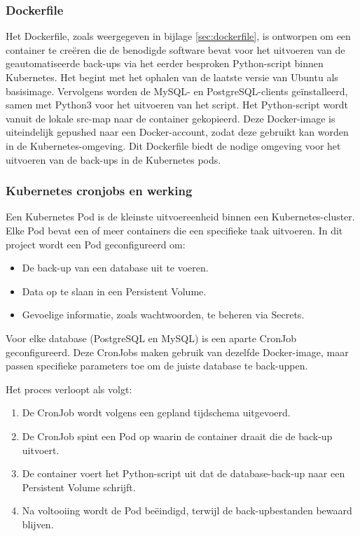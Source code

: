 \subsubsection{Dockerfile}
Het Dockerfile, zoals weergegeven in bijlage \ref{sec:dockerfile}, is ontworpen om een container te creëren die de benodigde software bevat voor het uitvoeren van de geautomatiseerde back-ups via het eerder besproken Python-script binnen Kubernetes. Het begint met het ophalen van de laatste versie van Ubuntu als basisimage. Vervolgens worden de MySQL- en PostgreSQL-clients geïnstalleerd, samen met Python3 voor het uitvoeren van het script. Het Python-script wordt vanuit de lokale src-map naar de container gekopieerd. Deze Docker-image is uiteindelijk gepushed naar een Docker-account, zodat deze gebruikt kan worden in de Kubernetes-omgeving. Dit Dockerfile biedt de nodige omgeving voor het uitvoeren van de back-ups in de Kubernetes pods.


\subsubsection{Kubernetes cronjobs en werking}
Een Kubernetes Pod is de kleinste uitvoereenheid binnen een Kubernetes-cluster. Elke Pod bevat een of meer containers die een specifieke taak uitvoeren. In dit project wordt een Pod geconfigureerd om:
\begin{itemize}
    \item De back-up van een database uit te voeren.
    \item Data op te slaan in een Persistent Volume.
    \item Gevoelige informatie, zoals wachtwoorden, te beheren via Secrets.
\end{itemize}

Voor elke database (PostgreSQL en MySQL) is een aparte CronJob geconfigureerd. Deze CronJobs maken gebruik van dezelfde Docker-image, maar passen specifieke parameters toe om de juiste database te back-uppen.

Het proces verloopt als volgt:
\begin{enumerate}
    \item De CronJob wordt volgens een gepland tijdschema uitgevoerd.
    \item De CronJob spint een Pod op waarin de container draait die de back-up uitvoert.
    \item De container voert het Python-script uit dat de database-back-up naar een Persistent Volume schrijft.
    \item Na voltooiing wordt de Pod beëindigd, terwijl de back-upbestanden bewaard blijven.
\end{enumerate}

